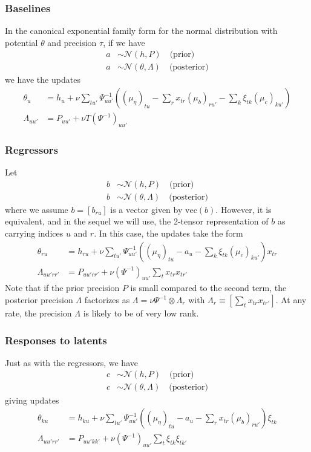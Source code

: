 \documentclass[11pt]{article}
\begin{document}
\subsubsection{Baselines}
In the canonical exponential family form for the normal distribution with potential $\theta$ and precision $\tau$, if we have
\begin{align}
    a &\sim \mathcal{N}(h, P) \quad \text{(prior)} \\
    a &\sim \mathcal{N}(\theta, \Lambda) \quad \text{(posterior)}
\end{align}
we have the updates
\begin{align}
    \theta_u &= h_u + \nu \sum_{tu'} \Psi^{-1}_{uu'} \left(
        (\mu_\eta)_{tu}
        - \sum_r x_{tr} (\mu_b)_{ru'}
        - \sum_k \xi_{tk} (\mu_c)_{ku'}
    \right) \\
    \Lambda_{uu'} &= P_{uu'} + \nu T (\Psi^{-1})_{uu'}
\end{align}

\subsubsection{Regressors}
Let
\begin{align}
    b &\sim \mathcal{N}(h, P) \quad \text{(prior)} \\
    b &\sim \mathcal{N}(\theta, \Lambda) \quad \text{(posterior)}
\end{align}
where we assume $b = [b_{ru}]$ is a vector given by $\mathrm{vec}(b)$. However, it is equivalent, and in the sequel we will use, the 2-tensor representation of $b$ as carrying indices $u$ and $r$.
In this case, the updates take the form
\begin{align}
    \theta_{ru} &= h_{ru} + \nu \sum_{tu'} \Psi^{-1}_{uu'} \left(
        (\mu_\eta)_{tu}
        - a_u
        - \sum_k \xi_{tk} (\mu_c)_{ku'}
    \right) x_{tr} \\
    \Lambda_{uu'rr'} &= P_{uu'rr'} + \nu (\Psi^{-1})_{uu'} \sum_t x_{tr} x_{tr'}
\end{align}
Note that if the prior precision $P$ is small compared to the second term, the posterior precision $\Lambda$ factorizes as $\Lambda = \nu \Psi^{-1} \otimes \Lambda_r$ with $\Lambda_r \equiv [\sum_t x_{tr}x_{tr'}]$. At any rate, the precision $\Lambda$ is likely to be of very low rank.

\subsubsection{Responses to latents}
Just as with the regressors, we have
\begin{align}
    c &\sim \mathcal{N}(h, P) \quad \text{(prior)} \\
    c &\sim \mathcal{N}(\theta, \Lambda) \quad \text{(posterior)}
\end{align}
giving updates
\begin{align}
    \theta_{ku} &= h_{ku} + \nu \sum_{tu'} \Psi^{-1}_{uu'} \left(
        (\mu_\eta)_{tu}
        - a_u
        - \sum_r x_{tr} (\mu_b)_{ru'}
    \right) \xi_{tk} \\
    \Lambda_{uu'rr'} &= P_{uu'kk'} + \nu (\Psi^{-1})_{uu'} \sum_t \xi_{tk} \xi_{tk'}
\end{align}
\end{document}
